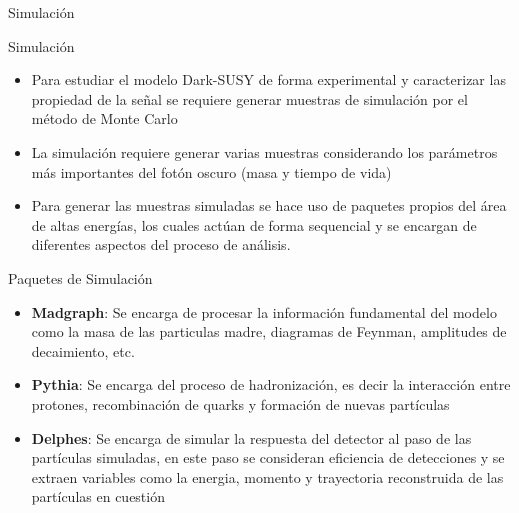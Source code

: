 \begin{frame}{}
    \begin{center}
        \LARGE Simulación
    \end{center}
\end{frame}

\begin{frame}{Simulación}

\begin{itemize}
    \item Para estudiar el modelo Dark-SUSY de forma experimental y caracterizar las propiedad de la se\~nal  
    se requiere generar muestras de simulación por el método de Monte Carlo 
    \item La simulación requiere generar varias muestras considerando los parámetros m\'as importantes del fotón oscuro (masa y tiempo de vida) 
    \item Para generar las muestras simuladas se hace uso de paquetes propios del área de altas energías, los cuales actúan de forma sequencial y se encargan de diferentes aspectos del proceso de análisis. 
\end{itemize}
    
\end{frame}


\begin{frame}{Paquetes de Simulación}
\begin{itemize}
    \item \textbf{Madgraph}: Se encarga de procesar la informaci\'on fundamental del modelo como la masa de las particulas madre, diagramas de Feynman, amplitudes de decaimiento, etc. 
    \item \textbf{Pythia}: Se encarga del proceso de hadronización, es decir la interacción entre protones, recombinación de quarks y formación de nuevas partículas 
    \item \textbf{Delphes}: Se encarga de simular la respuesta del detector al paso de las partículas simuladas, en este paso se consideran eficiencia de detecciones y se extraen variables como la energia, momento y trayectoria reconstruida de las partículas en cuestión
\end{itemize}

\end{frame}

